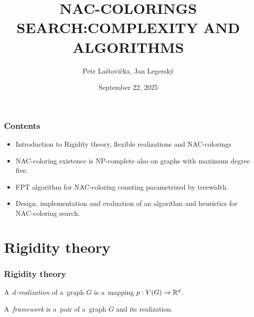 \documentclass[aspectratio=\myaspectratio]{beamer}
\title{NAC-COLORINGS SEARCH\@:\newline COMPLEXITY AND ALGORITHMS}
\author{Petr Laštovička, Jan Legerský}
\institute{Czech Technical University, Faculty of Information Technology}
\date{September 22, 2025}
\begin{document}
\maketitle

\begin{frame}
	\frametitle{Contents}
	\begin{itemize}
		\item
		      Introduction to Rigidity theory, flexible realizations and NAC-colorings
		\item
		      NAC-coloring existence is NP-complete also on graphs with maximum degree five.
		\item
		      FPT algorithm for NAC-coloring counting parametrized by treewidth.
		\item
		      Design, implementation and evaluation of an algorithm and heuristics for NAC-coloring search.
	\end{itemize}
\end{frame}

\section{Rigidity theory}

\begin{frame}
	\frametitle{Rigidity theory}
	\begin{definition}[\( d \)-realization]
		A~\emph{\( d \)-realization} of a~graph \( G \) is a~mapping \( p: V(G) \to \mathbb{R}^d \).
	\end{definition}
	\begin{definition}[Framework]
		A~\emph{framework} is a~pair of a~graph \( G \) and its realization.
	\end{definition}
\end{frame}
\end{document}
